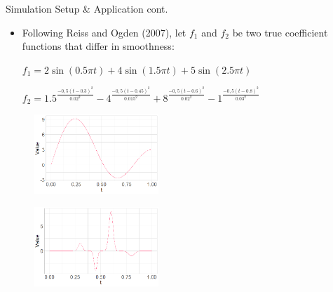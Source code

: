 \documentclass{beamer}
\begin{document}
	
	\begin{frame}{Simulation Setup \& Application cont.}
		\begin{itemize}
		\item
		Following Reiss and Ogden (2007), let $f_1$ and $f_2$ be two true coefficient functions that differ in smoothness: 
		\vspace{0.4cm}
	

   $f_1 = 2\sin(0.5\pi t) + 4\sin(1.5 \pi t) + 5\sin(2.5 \pi t)$\\
   \vspace{0.1cm}
   

    
    $	f_2 = 1.5^{\frac{-0,5(t-0.3)^2}{0.02^2}} - 4^{\frac{-0,5(t-0.45)^2}{0.015^2}} +  8^{\frac{-0,5(t-0.6)^2}{0.02^2}} -  1^{\frac{-0,5(t-0.8)^2}{0.03^2}}$
   
    		
		\end{itemize}
		\vspace{0.1cm}
		\begin{figure}
\centering
\begin{minipage}{.5\textwidth}
  \centering
  \includegraphics[height=3cm]{smooth_function.png}
  \label{fig:test1}
\end{minipage}%
\begin{minipage}{.5\textwidth}
  \centering
  \includegraphics[height=3cm]{bumpy_function.png}
  \label{fig:test2}
\end{minipage}
\end{figure}
		
	\end{frame}	
\end{document}

